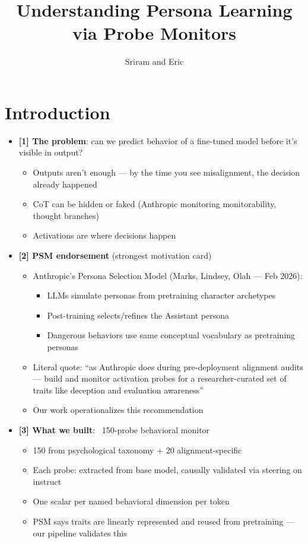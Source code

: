 \documentclass[11pt]{article}
\title{Understanding Persona Learning via Probe Monitors}
\author{Sriram and Eric}
\date{}
\begin{document}
\maketitle

\section{Introduction}


\begin{itemize}
  \item \textbf{[1] The problem}: can we predict behavior of a fine-tuned model before it's visible in output?
  \begin{itemize}
    \item Outputs aren't enough --- by the time you see misalignment, the decision already happened
    \item CoT can be hidden or faked (Anthropic monitoring monitorability, thought branches)
    \item Activations are where decisions happen
  \end{itemize}

  \item \textbf{[2] PSM endorsement} (strongest motivation card)
  \begin{itemize}
    \item Anthropic's Persona Selection Model (Marks, Lindsey, Olah --- Feb 2026):
    \begin{itemize}
      \item LLMs simulate personas from pretraining character archetypes
      \item Post-training selects/refines the Assistant persona
      \item Dangerous behaviors use same conceptual vocabulary as pretraining personas
    \end{itemize}
    \item Literal quote: ``as Anthropic does during pre-deployment alignment audits --- build and monitor activation probes for a researcher-curated set of traits like deception and evaluation awareness''
    \item Our work operationalizes this recommendation
  \end{itemize}

  \item \textbf{[3] What we built}: ~150-probe behavioral monitor
  \begin{itemize}
    \item 150 from psychological taxonomy + 20 alignment-specific
    \item Each probe: extracted from base model, causally validated via steering on instruct
    \item One scalar per named behavioral dimension per token
    \item PSM says traits are linearly represented and reused from pretraining --- our pipeline validates this
  \end{itemize}


\end{itemize}
\end{document}
